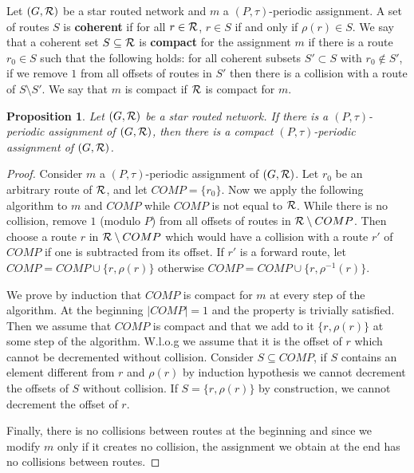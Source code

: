 \documentclass[10pt, conference, letterpaper]{IEEEtran}
\newtheorem{proposition}{Proposition}
\begin{document}
Let $(G, {\cal R})$ be a star routed network and $m$ a $(P,\tau)$-periodic assignment.
A set of routes $S$ is \textbf{coherent} if for all $r \in {\cal R}$, $r \in S$ if and only if $\rho(r) \in S$. We say that a coherent set $S \subseteq {\cal R}$ is \textbf{compact} for the assignment $m$ if there is a route $r_0 \in S$ such that the following holds:  
for all coherent subsets $S'\subset S$ with $r_0 \notin S'$, if we remove $1$ from all offsets of routes in $S'$ then there is a collision with a route of $S \setminus S'$. We say that $m$ is compact if ${\cal R}$ is compact for $m$. 
% 
% 

\begin{proposition}
Let $(G, {\cal R})$ be a star routed network. If there is a $(P,\tau)$-periodic assignment of $(G, {\cal R})$, then there is a compact $(P,\tau)$-periodic assignment of $(G, {\cal R})$.
\end{proposition}
\begin{proof}
Consider $m$ a $(P,\tau)$-periodic assignment of $(G, {\cal R})$.
Let $r_0$ be an arbitrary route of ${\cal R}$,  and let $COMP = \{r_0\}$. Now we apply the following algorithm to $m$ and $COMP$ while $COMP$ is not equal to ${\cal R}$.
While there is no collision, remove $1$ (modulo $P$) from all offsets of routes in ${\cal R} \setminus COMP$. Then choose a route $r$ in ${\cal R} \setminus COMP$ which would have a collision with a route $r'$ of $COMP$ if one is subtracted from its offset. If $r'$ is a forward route, let $COMP = COMP \cup \{r, \rho(r)\}$ otherwise  $COMP = COMP \cup \{r, \rho^{-1}(r)\}$. 

We prove by induction that $COMP$ is compact for $m$ at every step of the algorithm.
At the beginning $|COMP| = 1$ and the property is trivially satisfied. Then we assume that 
$COMP$ is compact and that we add to it $\{r, \rho(r)\}$ at some step of the algorithm. W.l.o.g we assume that it is the offset of $r$ which cannot be decremented without collision. Consider $S \subseteq   COMP$, if $S$ contains an element different from $r$ and $\rho(r)$ by induction hypothesis we cannot decrement the offsets of $S$ without collision. If $S =\{r, \rho(r)\}$
by construction, we cannot decrement the offset of $r$. 

Finally, there is no collisions between routes at the beginning and since we modify $m$ only if it creates no collision, the assignment we obtain at the end has no collisions between routes.
\end{proof}
\end{document}

